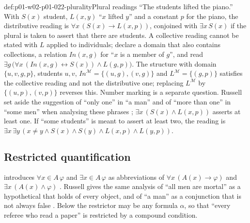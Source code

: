 \begin{hbexample}{def:p01-w02-p01-022-plurality}{Plural readings}
``The students lifted the piano.'' With \(S(x)\) student, \(L(x,y)\) ``\(x\)
lifted \(y\)'' and a constant \(p\) for the piano, the distributive reading
is \(\forall x\,(S(x)\to L(x,p))\), conjoined with \(\exists x\,S(x)\) if the
plural is taken to assert that there are students. A collective reading
cannot be stated with \(L\) applied to individuals; declare a domain that
also contains collections, a relation \(\mathit{In}(x,g)\) for ``\(x\) is a
member of \(g\)'', and read
\(\exists g\,\bigl(\forall x\,(\mathit{In}(x,g)\leftrightarrow S(x))\land
L(g,p)\bigr)\). The structure with domain \(\{u,v,g,p\}\), students
\(u,v\), \(\mathit{In}^{\mathcal M}=\{(u,g),(v,g)\}\) and
\(L^{\mathcal M}=\{(g,p)\}\) satisfies the collective reading and not the
distributive one; replacing \(L^{\mathcal M}\) by \(\{(u,p),(v,p)\}\)
reverses this. Number marking is a separate question. Russell set aside the
suggestion of ``only one'' in ``a man'' and of ``more than one'' in ``some
men'' when analysing these phrases \cite[481, footnote]{Russell1905};
\(\exists x\,(S(x)\land L(x,p))\) asserts at least one. If ``some students''
is meant to assert at least two, the reading is
\(\exists x\,\exists y\,(x\ne y\land S(x)\land S(y)\land L(x,p)\land
L(y,p))\).
\end{hbexample}

\subsection{Restricted quantification}
\label{sec:p01-w02-p01-022-restricted}

 introduces \(\forall x\in A\,\varphi\) and
\(\exists x\in A\,\varphi\) as abbreviations of
\(\forall x\,(A(x)\to\varphi)\) and \(\exists x\,(A(x)\land\varphi)\)
\cite[ch.~``Structures, Satisfaction, and Translation'', sec.~``Translation
with quantifiers'']{FrozenFormalLogicFormalizing}. Russell gives the same
analysis of ``all men are mortal'' as a hypothetical that holds of every
object, and of ``a man'' as a conjunction that is not always false
\cite[481]{Russell1905}. Below the restrictor may be any formula
\(\alpha\), so that ``every referee who read a paper'' is restricted by a
compound condition.

